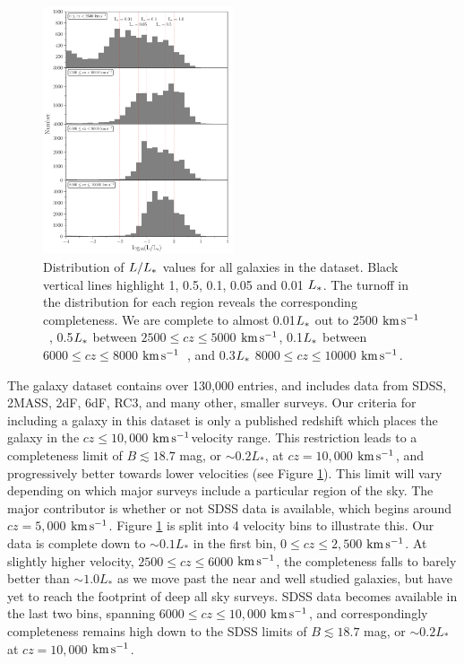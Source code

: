\documentclass[iop]{emulateapj-rtx4}
\newcommand{\kms}{$\rm km\, s^{-1}$}
\begin{document}
\begin{figure}[ht!]
        \centering
        \vspace{0pt}
        \includegraphics[width=0.50\textwidth]{fig1.pdf}
        \caption{\small{Distribution of $L/L_{\**}$ values for all galaxies in the dataset. Black vertical lines highlight 1, 0.5, 0.1, 0.05 and 0.01 $L_{\**}$. The turnoff in the distribution for each region reveals the corresponding completeness. We are complete to almost 			 0.01$L_{\**}$ out to 2500 \kms~, 0.5$L_{\**}$ between $2500 \leq cz \leq 5000$ \kms, 0.1$L_{\**}$ between $6000 \leq cz \leq 8000$ \kms~, and 0.3$L_{\**}$ $8000 \leq cz \leq 10000$ \kms.}}
        \vspace{5pt}
        \label{completeness}
\end{figure} 

The galaxy dataset contains over 130,000 entries, and includes data from SDSS, 2MASS, 2dF, 6dF, RC3, and many other, smaller surveys. Our criteria for including a galaxy in this dataset is only a published redshift which places the galaxy in the $cz \leq 10,000$ \kms velocity range. This restriction leads to a completeness limit of $B \lesssim 18.7$ mag, or $\sim0.2 L_*$, at $cz = 10,000$ \kms, and progressively better towards lower velocities (see Figure \ref{completeness}). This limit will vary depending on which major surveys include a particular region of the sky. The major contributor is whether or not SDSS data is available, which begins around $cz = 5,000$ \kms. Figure \ref{completeness} is split into 4 velocity bins to illustrate this. Our data is complete down to $\sim0.1 L_*$ in the first bin, $0 \leq cz \leq 2,500$ \kms. At slightly higher velocity, $2500 \leq cz \leq 6000$ \kms, the completeness falls to barely better than $\sim1.0 L_*$ as we move past the near and well studied galaxies, but have yet to reach the footprint of deep all sky surveys. SDSS data becomes available in the last two bins, spanning $6000 \leq cz \leq 10,000$ \kms, and correspondingly completeness remains high down to the SDSS limits of $B \lesssim 18.7$ mag, or $\sim0.2 L_*$ at $cz = 10,000$ \kms.
\end{document}
